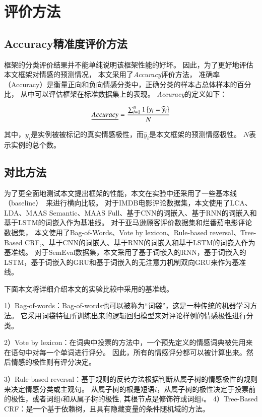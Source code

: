 \section{评价方法}

\subsection{Accuracy精准度评价方法}

框架的分类评价结果并不能单纯说明该框架性能的好坏。
因此，为了更好地评估本文框架对情感的预测情况，
本文采用了\emph{Accuracy}评价方法，
准确率（Accuracy）是衡量正向和负向情感分类中，正确分类的样本占总体样本的百分比，
从中可以评估框架在标准数据集上的表现。
\emph{Accuracy}的定义如下：

\begin{equation}
    \emph{Accuracy}=\frac{\sum_{i=1}^{n}1\left\{y_{i}=\widehat{y}_{i}\right\}}{N}
\end{equation}

其中，${y_{i}}$是实例被被标记的真实情感极性，而${\widehat{y}_{i}}$是本文框架的预测情感极性。
${N}$表示实例的总个数。

\subsection{对比方法}

为了更全面地测试本文提出框架的性能，本文在实验中还采用了一些基本线（baseline）~来进行横向比较。
对于IMDB电影评论数据集，本文使用了LCA、LDA、MAAS Semantic、MAAS Full、基于CNN的词嵌入、基于RNN的词嵌入和基于LSTM的词嵌入作为基准线。
对于亚马逊顾客评价数据集和烂番茄电影评论数据集，
本文使用了Bag-of-Words、Vote by lexicon、Rule-based reversal、Tree-Based CRF,、基于CNN的词嵌入、基于RNN的词嵌入和基于LSTM的词嵌入作为基准线。
对于SemEval数据集，本文采用了基于词嵌入的RNN，基于词嵌入的LSTM，基于词嵌入的GRU和基于词嵌入的无注意力机制双向GRU来作为基准线。

下面本文将详细介绍本文的实验比较中采用的基准线。

1）Bag-of-words：Bag-of-words也可以被称为“词袋”，这是一种传统的机器学习方法。
它采用词袋特征所训练出来的逻辑回归模型来对评论样例的情感极性进行分类。

2）Vote by lexicon：在词典中投票的方法中，一个预先定义的情感词典被先用来在语句中对每一个单词进行评分。
因此，所有的情感评分都可以被计算出来。然后情感的极性则有评分决定。

3）Rule-based reversal：基于规则的反转方法根据判断从属子树的情感极性的规则来决定情感分类或主观句。
从属子树的根是短语${i}$，从属子树的极性决定于投票前的极性，或者词组${i}$和从属子树的极性, 其根节点是修饰符或词组${i}$。
4）Tree-Based CRF：是一个基于依赖树，且具有隐藏变量的条件随机域的方法。

